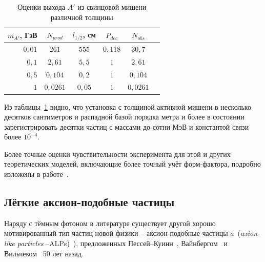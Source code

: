 \begin{table}[h]
\centering
\begin{tabular}{r|ccccc}
 $m_{A'}$, ГэВ & $N_{prod}$ & $l_{1/2}$, см & $P_{dec}$ & $N_{obs}$ \\ \hline
$0{,}01$ & $261$        & $555$    &  $0{,}118$ & $30{,}7$ \\
 $0{,}1$ & $2{,}61$     & $5{,}5$  &  $1$       & $2{,}61$ \\
 $0{,}5$ & $0{,}104$    & $0{,}2$  &  $1$       & $0{,}104$ \\
     $1$ & $0{,}0261$   & $0{,}05$ &  $1$       & $0{,}0261$
\end{tabular}
\caption{Оценки выхода $A'$ из свинцовой мишени различной толщины}
\label{tab:aprime-geom-yield-estimations}
\end{table}

Из таблицы~\ref{tab:aprime-geom-yield-estimations} видно, что установка
с толщиной активной мишени в несколько десятков сантиметров и распадной
базой порядка метра и более в состоянии зарегистрировать десятки
частиц с массами до сотни МэВ и константой связи более $10^{-4}$.

Более точные оценки чувствительности эксперимента для этой и других
теоретических моделей, включающие более точный учёт форм-фактора,
подробно изложены в работе~\cite{voronchihin2025}.

\subsection{Лёгкие аксион-подобные частицы}

Наряду с тёмным фотоном в литературе существует другой хорошо мотивированный 
тип частиц новой физики --
аксион-подобные частицы $a$~(\emph{axion-like particles} --ALPs)~\cite{Dobrich2016}), 
предложенных Пессей--Куинн~\cite{Peccei:1977hh}, Вайнбергом~\cite{Weinberg:1977ma} 
и Вильчеком~\cite{Wilczek:1977pj} 50 лет назад. 

